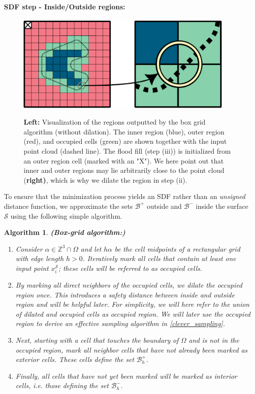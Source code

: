 \documentclass[12pt,openany]{book}
\def\S{\mathcal{S}}
\theoremstyle{plainnormal}
\newtheorem{algorithm}[theorem]{Algorithm}
\theoremstyle{remark}
\begin{document}
\paragraph{SDF step - Inside/Outside regions:}
\begin{figure}[!b]
    \centering
    \includegraphics[width = 0.95\textwidth]{Figures/InnerOuter.pdf}\label{InnerOuter}
    \caption{\textbf{Left:} Visualization of the regions outputted by the box grid algorithm (without dilation). The inner region (blue), outer region (red), and occupied cells (green) are shown together with the input point cloud (dashed line). The flood fill (step (iii)) is initialized from an outer region cell (marked with an "X"). We here point out that inner and outer regions may lie arbitrarily close to the point cloud (\textbf{right)}, which is why we dilate the region in step (ii).
}
\end{figure}
To ensure that the minimization process yields an SDF rather than an \emph{unsigned} distance function, we approximate the sets $\mathcal{B}^+$ outside and $\mathcal{B}^-$ inside the surface $\mathcal{S}$ using the following simple algorithm.
\begin{algorithm}\textbf{(Box-grid algorithm:)}\label{box_algorithm}
\begin{enumerate}
    \item Consider $\alpha \in \mathbb{Z}^3\cap\Omega$ and let $h\alpha $ be the cell midpoints of a rectangular grid with edge length $h > 0$. Iteratively mark all cells that contain at least one input point $x_i^\S$; these cells will be referred to as \emph{occupied cells}.
    \item By marking all direct neighbors of the occupied cells, we dilate the occupied region once. This introduces a safety distance between inside and outside region and will be helpful later. For simplicity, we will here refer to the union of dilated and occupied cells as \emph{occupied region}. We will later use the occupied region to derive an effective sampling algorithm in \ref{clever_sampling}.
    \item Next, starting with a cell that touches the boundary of $\Omega$ and is not in the occupied region, mark all neighbor cells that have not already been marked as \emph{exterior cells}. These cells define the set $\mathcal{B}^+_h$.
    \item Finally, all cells that have not yet been marked will be marked as \emph{interior cells}, i.e. those defining the set $\mathcal{B}_h^-$.
    \end{enumerate}
\end{algorithm}
\end{document}
